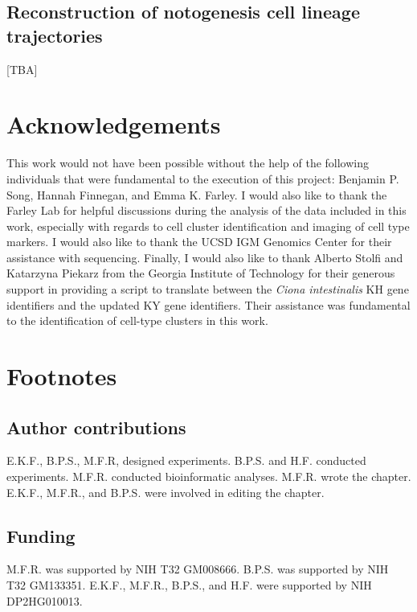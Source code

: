 \subsection{Reconstruction of notogenesis cell lineage trajectories}

[TBA]

\section{Acknowledgements}

This work would not have been possible without the help of the following individuals that were fundamental to the execution of this project: Benjamin P. Song, Hannah Finnegan, and Emma K. Farley. I would also like to thank the Farley Lab for helpful discussions during the analysis of the data included in this work, especially with regards to cell cluster identification and imaging of cell type markers. I would also like to thank the UCSD IGM Genomics Center for their assistance with sequencing. Finally, I would also like to thank Alberto Stolfi and Katarzyna Piekarz from the Georgia Institute of Technology for their generous support in providing a script to translate between the \textit{Ciona intestinalis} KH gene identifiers and the updated KY gene identifiers. Their assistance was fundamental to the identification of cell-type clusters in this work.

\section{Footnotes}

\subsection{Author contributions}
E.K.F., B.P.S., M.F.R, designed experiments. B.P.S. and H.F. conducted experiments. M.F.R. conducted bioinformatic analyses. M.F.R. wrote the chapter. E.K.F., M.F.R., and B.P.S. were involved in editing the chapter. 

\subsection{Funding}
M.F.R. was supported by NIH T32 GM008666. B.P.S. was supported by NIH T32 GM133351. E.K.F., M.F.R., B.P.S., and H.F. were supported by NIH DP2HG010013.

